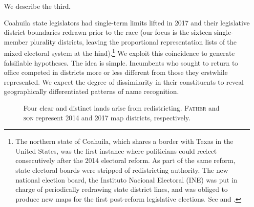 \documentclass[letter,12pt]{article}
\begin{document}
\noindent We describe the third.

Coahuila state legislators had single-term limits lifted in 2017 and their legislative district boundaries redrawn prior to the race (our focus is the sixteen single-member plurality districts, leaving the proportional representation lists of the mixed electoral system at the hind).\footnote{The northern state of Coahuila, which shares a border with Texas in the United States, was the first instance where politicians could reelect consecutively after the 2014 electoral reform. As part of the same reform, state electoral boards were stripped of redistricting authority. The new national election board, the Instituto Nacional Electoral (INE) was put in charge of periodically redrawing state district lines, and was obliged to produce new maps for the first post-reform legislative elections. See \citet{trelles.etalDatosabiertos.pyg.2016} and \citet{magarInstReel.2017}.} We exploit this coincidence to generate falsifiable hypotheses. The idea is simple. Incumbents who sought to return to office competed in districts more or less different from those they erstwhile represented. We expect the degree of dissimilarity in their constituents to reveal geographically differentiated patterns of name recognition. 

\begin{figure}
  \centering
    \usetikzlibrary{calc}
    \caption{Four clear and distinct lands arise from redistricting. \textsc{Father} and \textsc{son} represent 2014 and 2017 map districts, respectively.}\label{F:venn}
\end{figure}
\end{document}
